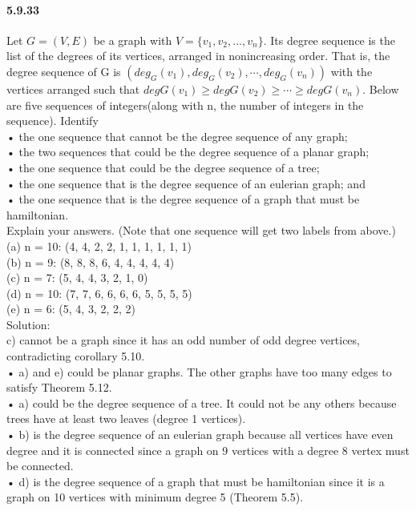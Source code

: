 \documentclass{article}
\begin{document}
\paragraph{5.9.33}
Let $G = (V, E)$ be a graph with $V=\{v_1, v_2, . . . , v_n \}$. Its degree sequence is the list of the degrees of its vertices, arranged in nonincreasing order. That is, the degree sequence of G is $(deg_G(v_1), deg_G(v_2), \cdots , deg_G(v_n))$ with the vertices arranged such that $degG(v_1) \ge degG(v_2) \ge \cdots \ge degG(v_n)$. Below are five sequences of integers(along with n, the number of integers in the sequence). Identify\\
• the one sequence that cannot be the degree sequence of any graph;\\
• the two sequences that could be the degree sequence of a planar graph;\\
• the one sequence that could be the degree sequence of a tree;\\
• the one sequence that is the degree sequence of an eulerian graph; and\\
• the one sequence that is the degree sequence of a graph that must be hamiltonian.\\
Explain your answers. (Note that one sequence will get two labels from above.)\\
(a) n = 10: (4, 4, 2, 2, 1, 1, 1, 1, 1, 1)\\
(b) n = 9: (8, 8, 8, 6, 4, 4, 4, 4, 4)\\
(c) n = 7: (5, 4, 4, 3, 2, 1, 0)\\
(d) n = 10: (7, 7, 6, 6, 6, 6, 5, 5, 5, 5)\\
(e) n = 6: (5, 4, 3, 2, 2, 2)\\
Solution:\\
c) cannot be a graph since it has an odd number of odd degree vertices, contradicting
corollary 5.10.\\
• a) and e) could be planar graphs. The other graphs have too many edges to satisfy
Theorem 5.12.\\
• a) could be the degree sequence of a tree. It could not be any others because trees have
at least two leaves (degree 1 vertices).\\
• b) is the degree sequence of an eulerian graph because all vertices have even degree and
it is connected since a graph on 9 vertices with a degree 8 vertex must be connected.\\
• d) is the degree sequence of a graph that must be hamiltonian since it is a graph on 10
vertices with minimum degree 5 (Theorem 5.5).
\end{document}
